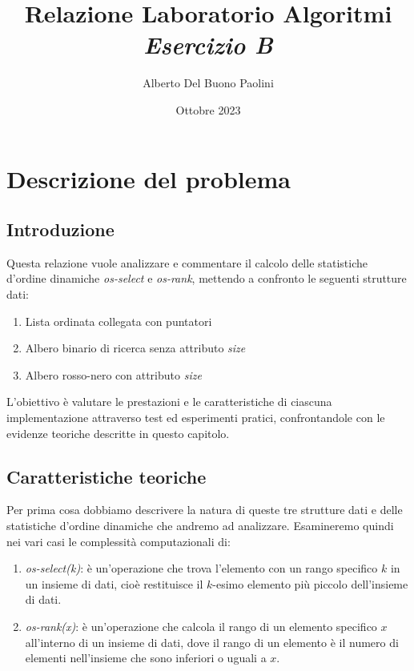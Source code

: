 \documentclass[onecolumn]{article}
\title{Relazione Laboratorio Algoritmi\\\textit{Esercizio B}}
\author{Alberto Del Buono Paolini}
\date{Ottobre 2023}
\begin{document}
\begin{onecolumn}
	\vspace*{-6em}
	{\let\newpage\relax\maketitle}
	\vspace*{-2em}
	\tableofcontents
\end{onecolumn}
\vspace{1cm}
\pagebreak

\section{Descrizione del problema}

\subsection{Introduzione}
Questa relazione vuole analizzare e commentare il calcolo delle statistiche d'ordine dinamiche \textit{os-select} e \textit{os-rank}, mettendo a confronto le seguenti strutture dati: 
\begin{enumerate}
	\setlength\itemsep{-0.25em}
	\item Lista ordinata collegata con puntatori
	\item Albero binario di ricerca senza attributo \textit{size}
	\item Albero rosso-nero con attributo \textit{size}
\end{enumerate}

L'obiettivo è valutare le prestazioni e le caratteristiche di ciascuna implementazione attraverso test ed esperimenti pratici, confrontandole con le evidenze teoriche descritte in questo capitolo.

\subsection{Caratteristiche teoriche}

Per prima cosa dobbiamo descrivere la natura di queste tre strutture dati e delle statistiche d'ordine dinamiche che andremo ad analizzare. Esamineremo quindi nei vari casi le complessità computazionali di:

\begin{enumerate}
	\setlength\itemsep{-0.25em}
	\item \textit{os-select(k)}: è un'operazione che trova l'elemento con un rango specifico $k$ in un insieme di dati, cioè restituisce il $k$-esimo elemento più piccolo dell'insieme di dati.
	\item \textit{os-rank(x)}: è un'operazione che calcola il rango di un elemento specifico $x$ all'interno di un insieme di dati, dove il rango di un elemento è il numero di elementi nell'insieme che sono inferiori o uguali a $x$.
\end{enumerate}
\end{document}
